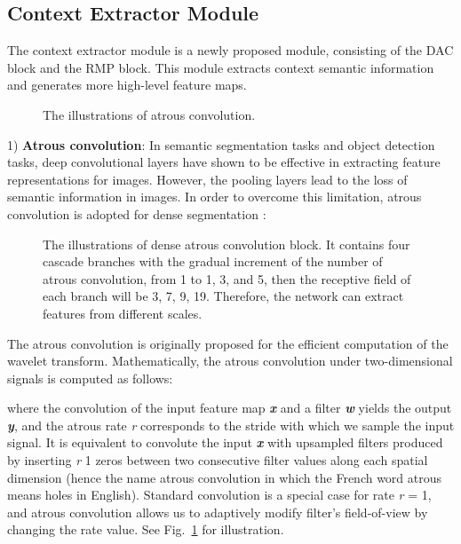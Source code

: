 \documentclass[journal]{IEEEtran}
\begin{document}
\subsection{Context Extractor Module}
The context extractor module is a newly proposed module, consisting of  the DAC block and  the RMP block. This module extracts context semantic information and generates more high-level feature maps.
\begin{figure}[h]
	\centering
	\caption{The illustrations of atrous convolution.}
	\label{picture1}
\end{figure}

1) \textbf{Atrous convolution}: In semantic segmentation tasks and object detection tasks, deep convolutional layers have shown to be effective in extracting feature representations for images. However, the pooling layers  lead to the loss of semantic information in images. In order to overcome this limitation, atrous convolution is adopted for dense segmentation \cite{chen2017deeplab}:

\begin{figure}[h]
	\centering
	\caption{The illustrations of dense atrous convolution block. It contains four cascade branches with the gradual increment of the number of atrous convolution, from 1 to 1, 3, and 5, then the receptive field of each branch will be 3, 7, 9, 19. Therefore, the network can extract features from different scales.}
	\label{picture2}
\end{figure}

The atrous convolution is originally proposed for the efficient computation of the wavelet transform. Mathematically, the atrous convolution under two-dimensional signals is computed as follows:

where the convolution of the input feature map \textbf{\emph{x}} and a filter \textbf{\emph{w}} yields the output \textbf{\emph{y}}, and the atrous rate {\emph{r}} corresponds to the stride with which we sample the input signal. It is equivalent to convolute
the input \textbf{\emph{x}} with upsampled filters produced by inserting
{\emph{r}}  1 zeros between two consecutive filter values along each
spatial dimension (hence the name atrous convolution in which
the French word atrous means holes in English). Standard
convolution is a special case for rate {\emph{r}} = 1, and atrous
convolution allows us to adaptively modify filter’s field-of-view by changing the rate value. See Fig.~\ref{picture1} for illustration.
\end{document}
